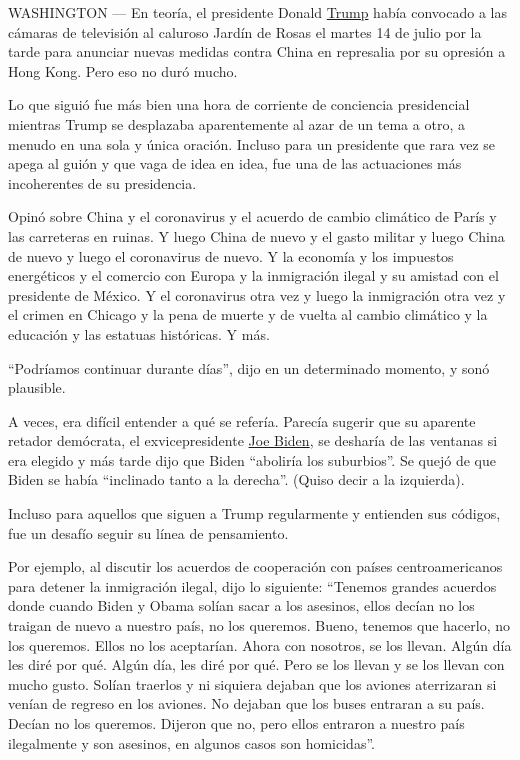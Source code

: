 WASHINGTON --- En teoría, el presidente Donald
\href{https://www.nytimes.com/2020/07/14/us/politics/trump-white-people-killed-by-police.html}{Trump}
había convocado a las cámaras de televisión al caluroso Jardín de Rosas
el martes 14 de julio por la tarde para anunciar nuevas medidas contra
China en represalia por su opresión a Hong Kong. Pero eso no duró mucho.

Lo que siguió fue más bien una hora de corriente de conciencia
presidencial mientras Trump se desplazaba aparentemente al azar de un
tema a otro, a menudo en una sola y única oración. Incluso para un
presidente que rara vez se apega al guión y que vaga de idea en idea,
fue una de las actuaciones más incoherentes de su presidencia.

Opinó sobre China y el coronavirus y el acuerdo de cambio climático de
París y las carreteras en ruinas. Y luego China de nuevo y el gasto
militar y luego China de nuevo y luego el coronavirus de nuevo. Y la
economía y los impuestos energéticos y el comercio con Europa y la
inmigración ilegal y su amistad con el presidente de México. Y el
coronavirus otra vez y luego la inmigración otra vez y el crimen en
Chicago y la pena de muerte y de vuelta al cambio climático y la
educación y las estatuas históricas. Y más.

``Podríamos continuar durante días'', dijo en un determinado momento, y
sonó plausible.

A veces, era difícil entender a qué se refería. Parecía sugerir que su
aparente retador demócrata, el exvicepresidente
\href{https://www.nytimes.com/es/interactive/2020/espanol/estados-unidos/joe-biden-elecciones.html}{Joe
Biden}, se desharía de las ventanas si era elegido y más tarde dijo que
Biden ``aboliría los suburbios''. Se quejó de que Biden se había
``inclinado tanto a la derecha''. (Quiso decir a la izquierda).

Incluso para aquellos que siguen a Trump regularmente y entienden sus
códigos, fue un desafío seguir su línea de pensamiento.

Por ejemplo, al discutir los acuerdos de cooperación con países
centroamericanos para detener la inmigración ilegal, dijo lo siguiente:
``Tenemos grandes acuerdos donde cuando Biden y Obama solían sacar a los
asesinos, ellos decían no los traigan de nuevo a nuestro país, no los
queremos. Bueno, tenemos que hacerlo, no los queremos. Ellos no los
aceptarían. Ahora con nosotros, se los llevan. Algún día les diré por
qué. Algún día, les diré por qué. Pero se los llevan y se los llevan con
mucho gusto. Solían traerlos y ni siquiera dejaban que los aviones
aterrizaran si venían de regreso en los aviones. No dejaban que los
buses entraran a su país. Decían no los queremos. Dijeron que no, pero
ellos entraron a nuestro país ilegalmente y son asesinos, en algunos
casos son homicidas''.

